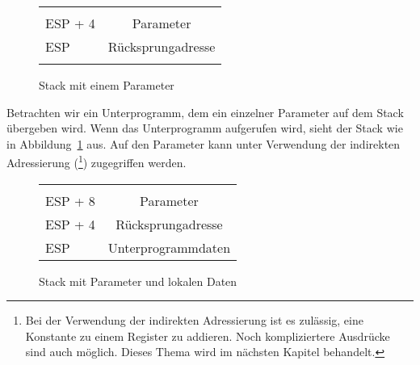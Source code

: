 \begin{figure}[ht]
\centering
\begin{tabular}{l|c|}
 \cline{2-2} &  \\
 \cline{2-2} ESP + 4 & Parameter \\
 \cline{2-2} ESP     & R\"{u}cksprungadresse \\
 \cline{2-2}  & \\
 \cline{2-2}
\end{tabular}
\caption{Stack mit einem Parameter} \label{fig:stack1}
\end{figure}

Betrachten wir ein Unterprogramm, dem ein einzelner Parameter auf
dem Stack \"{u}bergeben wird. Wenn das Unterprogramm aufgerufen wird,
sieht der Stack wie in Abbildung~\ref{fig:stack1} aus. Auf den
Parameter kann unter Verwendung der indirekten Adressierung ({\code
[ESP~+~4]}\footnote{Bei der Verwendung der indirekten Adressierung
ist es zul\"{a}ssig, eine Konstante zu einem Register zu addieren. Noch
kompliziertere Ausdr\"{u}cke sind auch m\"{o}glich. Dieses Thema wird im
n\"{a}chsten Kapitel behandelt.}) zugegriffen werden.

\begin{figure}[ht]
\centering
\begin{tabular}{l|c|}
 \cline{2-2}
 &  \\
 \cline{2-2}
 ESP + 8 & Parameter \\
 \cline{2-2}
 ESP + 4 & R\"{u}cksprungadresse \\
 \cline{2-2}
 ESP     & Unterprogrammdaten \\
 \cline{2-2}
\end{tabular}
\caption{Stack mit Parameter und lokalen Daten} \label{fig:stack2}
\end{figure}

